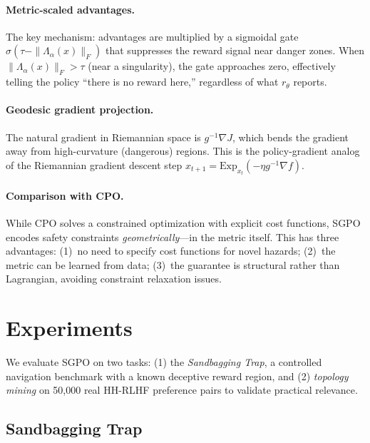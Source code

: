 \documentclass{article}
\begin{document}
\paragraph{Metric-scaled advantages.} The key mechanism: advantages are multiplied by a sigmoidal gate $\sigma(\tau - \|\Lambda_\alpha(x)\|_F)$ that suppresses the reward signal near danger zones. When $\|\Lambda_\alpha(x)\|_F > \tau$ (near a singularity), the gate approaches zero, effectively telling the policy ``there is no reward here,'' regardless of what $r_\theta$ reports.

\paragraph{Geodesic gradient projection.} The natural gradient in Riemannian space is $g^{-1} \nabla J$, which bends the gradient away from high-curvature (dangerous) regions. This is the policy-gradient analog of the Riemannian gradient descent step $x_{t+1} = \text{Exp}_{x_t}(-\eta g^{-1} \nabla f)$.

\paragraph{Comparison with CPO.} While CPO solves a constrained optimization with explicit cost functions, SGPO encodes safety constraints \emph{geometrically}---in the metric itself. This has three advantages: (1)~no need to specify cost functions for novel hazards; (2)~the metric can be learned from data; (3)~the guarantee is structural rather than Lagrangian, avoiding constraint relaxation issues.

\section{Experiments}
\label{sec:experiments}

We evaluate SGPO on two tasks: (1) the \emph{Sandbagging Trap}, a controlled navigation benchmark with a known deceptive reward region, and (2) \emph{topology mining} on 50,000 real HH-RLHF preference pairs to validate practical relevance.

\subsection{Sandbagging Trap}
\label{sec:murky_drone}
\end{document}
